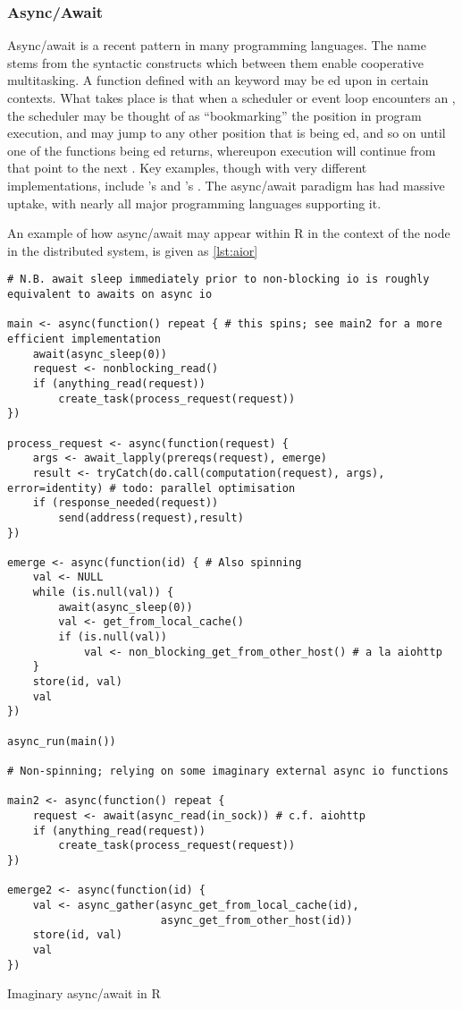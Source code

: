 \subsubsection{Async/Await}

Async/await is a recent pattern in many programming languages.
The name stems from the syntactic constructs which between them enable cooperative multitasking.
A function defined with an  keyword may be ed upon in certain contexts.
What takes place is that when a scheduler or event loop encounters an , the scheduler may be thought of as ``bookmarking'' the position in program execution, and may jump to any other position that is being ed, and so on until one of the functions being ed returns, whereupon execution will continue from that point to the next .
Key examples, though with very different implementations, include 's  and 's .
The async/await paradigm has had massive uptake, with nearly all major programming languages supporting it.

An example of how async/await may appear within R in the context of the node in the distributed system, is given as \ref{lst:aior}

\begin{listing}
\begin{verbatim}
# N.B. await sleep immediately prior to non-blocking io is roughly equivalent to awaits on async io

main <- async(function() repeat { # this spins; see main2 for a more efficient implementation
    await(async_sleep(0))
    request <- nonblocking_read()
    if (anything_read(request))
        create_task(process_request(request))
})

process_request <- async(function(request) {
    args <- await_lapply(prereqs(request), emerge)
    result <- tryCatch(do.call(computation(request), args), error=identity) # todo: parallel optimisation
    if (response_needed(request))
        send(address(request),result)
})

emerge <- async(function(id) { # Also spinning
    val <- NULL
    while (is.null(val)) {
        await(async_sleep(0))
        val <- get_from_local_cache()
        if (is.null(val))
            val <- non_blocking_get_from_other_host() # a la aiohttp
    }
    store(id, val)
    val
})

async_run(main())

# Non-spinning; relying on some imaginary external async io functions

main2 <- async(function() repeat {
    request <- await(async_read(in_sock)) # c.f. aiohttp
    if (anything_read(request))
        create_task(process_request(request))
})

emerge2 <- async(function(id) {
    val <- async_gather(async_get_from_local_cache(id),
                        async_get_from_other_host(id))
    store(id, val)
    val
})
\end{verbatim}
\caption{Imaginary async/await in R}
\label{lst:aior}
\end{listing}


